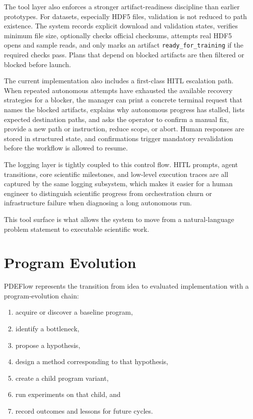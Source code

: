 \documentclass[11pt]{article}
\begin{document}
The tool layer also enforces a stronger artifact-readiness discipline than earlier prototypes. For datasets, especially HDF5 files, validation is not reduced to path existence. The system records explicit download and validation states, verifies minimum file size, optionally checks official checksums, attempts real HDF5 opens and sample reads, and only marks an artifact \texttt{ready\_for\_training} if the required checks pass. Plans that depend on blocked artifacts are then filtered or blocked before launch.

The current implementation also includes a first-class HITL escalation path. When repeated autonomous attempts have exhausted the available recovery strategies for a blocker, the manager can print a concrete terminal request that names the blocked artifacts, explains why autonomous progress has stalled, lists expected destination paths, and asks the operator to confirm a manual fix, provide a new path or instruction, reduce scope, or abort. Human responses are stored in structured state, and confirmations trigger mandatory revalidation before the workflow is allowed to resume.

The logging layer is tightly coupled to this control flow. HITL prompts, agent transitions, core scientific milestones, and low-level execution traces are all captured by the same logging subsystem, which makes it easier for a human engineer to distinguish scientific progress from orchestration churn or infrastructure failure when diagnosing a long autonomous run.

This tool surface is what allows the system to move from a natural-language problem statement to executable scientific work.

\section{Program Evolution}
PDEFlow represents the transition from idea to evaluated implementation with a program-evolution chain:
\begin{enumerate}[leftmargin=1.5em]
  \item acquire or discover a baseline program,
  \item identify a bottleneck,
  \item propose a hypothesis,
  \item design a method corresponding to that hypothesis,
  \item create a child program variant,
  \item run experiments on that child, and
  \item record outcomes and lessons for future cycles.
\end{enumerate}
\end{document}
